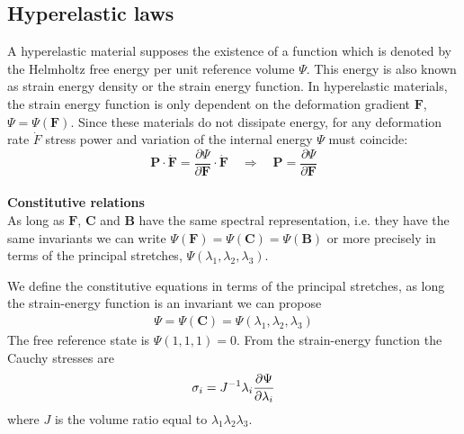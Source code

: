 \documentclass[12pt,a4paper]{article}
\numberwithin{equation}{section}
\begin{document}
\subsection{Hyperelastic laws}
A hyperelastic material supposes the existence of a function which is denoted by the Helmholtz free energy per unit reference volume $\Psi$. This energy  is also known as strain energy density or the strain energy function. In hyperelastic materials, the strain energy function  is only dependent on the deformation gradient $\mathbf{F}$, $\Psi = \Psi (\mathbf{F})$.
Since these materials do not dissipate energy, for any deformation rate $\dot{F}$ stress power and variation of the internal energy $\Psi$ must coincide:
\begin{equation}
\mathbf{P}\cdot \dot{\mathbf{F}} = \frac{\partial \Psi}{\partial \mathbf{F}} \cdot \dot{\mathbf{F}} \quad \Rightarrow \quad \mathbf{P} = \frac{\partial \Psi}{\partial \mathbf{F}} 
\end{equation} 
\\
{\bf Constitutive relations}\\
As long as $\mathbf{F}$, $\mathbf{C}$ and $\mathbf{B}$ have the same spectral representation, i.e. they have the same invariants we can write $\Psi(\mathbf{F}) = \Psi(\mathbf{C}) = \Psi( \mathbf{B})$ or more precisely in terms of the principal stretches, $\Psi(\lambda_1,\lambda_2,\lambda_3)$.

\noindent
We define the constitutive equations in terms of the principal stretches, as long the strain-energy function is an invariant we can propose
\begin{align} 
\Psi = \Psi(\mathbf{C}) = \Psi(\lambda_1,\lambda_2,\lambda_3)
\end{align} 
The free reference state is $\Psi(1,1,1)=0$. From the  strain-energy function the Cauchy stresses are
\begin{align} 
\sigma_i=  J^{-1} \lambda_i { \partial \Psi \over \partial \lambda_i}
\end{align} 
where $J$ is the volume ratio equal to $\lambda_1 \lambda_2 \lambda_3$. 
\end{document}
